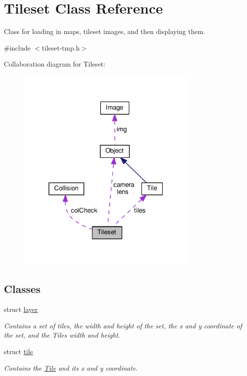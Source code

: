\hypertarget{classTileset}{}\section{Tileset Class Reference}
\label{classTileset}


Class for loading in maps, tileset images, and then displaying them.  




{\ttfamily \#include $<$tileset-\/tmp.\+h$>$}



Collaboration diagram for Tileset\+:\nopagebreak
\begin{figure}[H]
\begin{center}
\leavevmode
\includegraphics[width=256pt]{classTileset__coll__graph}
\end{center}
\end{figure}
\subsection*{Classes}
\begin{DoxyCompactItemize}
\item 
struct \hyperlink{structTileset_1_1layer}{layer}
\begin{DoxyCompactList}\small\item\em Contains a set of tiles, the width and height of the set, the x and y coordinate of the set, and the Tiles width and height. \end{DoxyCompactList}\item 
struct \hyperlink{structTileset_1_1tile}{tile}
\begin{DoxyCompactList}\small\item\em Contains the \hyperlink{classTile}{Tile} and its x and y coordinate. \end{DoxyCompactList}\end{DoxyCompactItemize}
